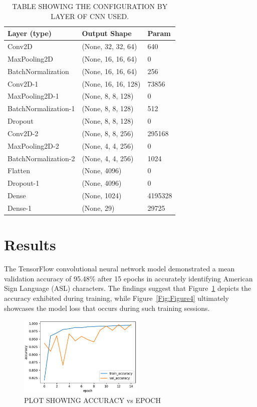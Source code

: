 \documentclass[conference]{IEEEtran}
\begin{document}
\begin{table}[!t]
\centering
\caption{TABLE SHOWING THE CONFIGURATION BY LAYER OF CNN USED.}
\label{tab:CCN-config} 
\begin{tabular}{|l|l|l|}
\hline
\textbf{Layer (type)} & \textbf{Output Shape} & \textbf{Param} \\ \hline
Conv2D & (None, 32, 32, 64) & 640 \\
MaxPooling2D & (None, 16, 16, 64) & 0 \\
BatchNormalization & (None, 16, 16, 64) & 256 \\
Conv2D-1 & (None, 16, 16, 128) & 73856 \\
MaxPooling2D-1 & (None, 8, 8, 128) & 0 \\
BatchNormalization-1 & (None, 8, 8, 128) & 512 \\
Dropout & (None, 8, 8, 128) & 0 \\
Conv2D-2 & (None, 8, 8, 256) & 295168 \\
MaxPooling2D-2 & (None, 4, 4, 256) & 0 \\
BatchNormalization-2 & (None, 4, 4, 256) & 1024 \\
Flatten & (None, 4096) & 0 \\
Dropout-1 & (None, 4096) & 0 \\
Dense & (None, 1024) & 4195328 \\
Dense-1 & (None, 29) & 29725 \\ \hline
\end{tabular}
\end{table}

\section{Results}
The TensorFlow convolutional neural network model demonstrated a mean validation accuracy of 95.48\% after 15 epochs in accurately identifying American Sign Language (ASL) characters. The findings suggest that Figure~\ref{Fig:Figure3} depicts the accuracy exhibited during training, while Figure~\ref{Fig:Figure4} ultimately showcases the model loss that occurs during such training sessions.

\begin{figure}[t!]
\centering
\includegraphics[width=6cm]{Images/accuracy_plot.png}
\caption{PLOT SHOWING ACCURACY vs EPOCH}
\label{Fig:Figure3}
\end{figure}
\end{document}
